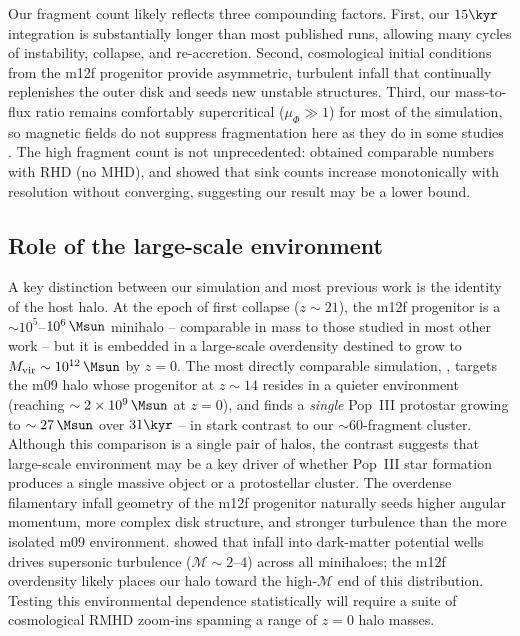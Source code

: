 Our fragment count likely reflects three compounding factors.
First, our $15\kyr$ integration is substantially longer than most
published runs, allowing many cycles of instability, collapse, and
re-accretion.
Second, cosmological initial conditions from the m12f progenitor
provide asymmetric, turbulent infall that continually replenishes
the outer disk and seeds new unstable structures.
Third, our mass-to-flux ratio remains comfortably supercritical
($\mu_\Phi \gg 1$) for most of the simulation, so magnetic fields
do not suppress fragmentation here as they do in some studies
\citep{stacy22, machida25}.
The high fragment count is not unprecedented: \citet{latif_khochfar22}
obtained comparable numbers with RHD (no MHD), and
\citet{prole22} showed that sink counts increase monotonically with
resolution without converging, suggesting our result may be a lower
bound.

\subsection*{Role of the large-scale environment}

A key distinction between our simulation and most previous work is
the identity of the host halo.
At the epoch of first collapse ($z \sim 21$), the m12f progenitor is
a $\sim 10^5$--$10^6\,\Msun$ minihalo -- comparable in mass to those
studied in most other work -- but it is embedded in a large-scale
overdensity destined to grow to $M_\mathrm{vir} \sim 10^{12}\,\Msun$
by $z = 0$.
The most directly comparable simulation, \citet{meziani26}, targets
the m09 halo whose progenitor at $z \sim 14$ resides in a quieter
environment (reaching $\sim 2 \times 10^9\,\Msun$ at $z = 0$),
and finds a \textit{single} Pop~III protostar growing to
$\sim 27\,\Msun$ over $31\kyr$ -- in stark contrast to our
$\sim 60$-fragment cluster.
Although this comparison is a single pair of halos, the contrast
suggests that large-scale environment may be a key driver of whether
Pop~III star formation produces a single massive object or a
protostellar cluster.
The overdense filamentary infall geometry of the m12f progenitor
naturally seeds higher angular momentum, more complex disk structure,
and stronger turbulence than the more isolated m09 environment.
\citet{ho25} showed that infall into dark-matter potential wells
drives supersonic turbulence ($\mathcal{M} \sim 2$--$4$) across all
minihaloes; the m12f overdensity likely places our halo toward the
high-$\mathcal{M}$ end of this distribution.
Testing this environmental dependence statistically will require a
suite of cosmological RMHD zoom-ins spanning a range of $z=0$ halo
masses.

